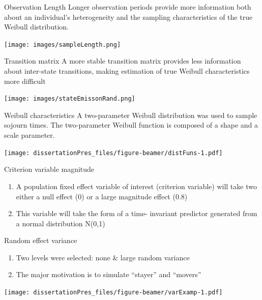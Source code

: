 \documentclass[
  ignorenonframetext,
]{beamer}
\providecommand{\tightlist}{%
  \setlength{\itemsep}{0pt}\setlength{\parskip}{0pt}}
\begin{document}
\begin{frame}{Observation Length}
\label{observation-length}
Longer observation periods provide more information both about an
individual's heterogeneity and the sampling characteristics of the true
Weibull distribution.

\begin{block}{}
\label{section-1}
\texttt{[image: images/sampleLength.png]}
\end{block}
\end{frame}

\begin{frame}{Transition matrix}
\label{transition-matrix}
A more stable transition matrix provides less information about
inter-state transitions, making estimation of true Weibull
characteristics more difficult

\begin{block}{}
\label{section-2}
\texttt{[image: images/stateEmissonRand.png]}
\end{block}
\end{frame}

\begin{frame}{Weibull characteristics}
\label{weibull-characteristics}
A two-parameter Weibull distribution was used to sample sojourn times.
The two-parameter Weibull function is composed of a shape and a scale
parameter.

\texttt{[image: dissertationPres\_files/figure-beamer/distFuns-1.pdf]}
\end{frame}

\begin{frame}{Criterion variable magnitude}
\label{criterion-variable-magnitude}
\begin{enumerate}
\tightlist
\item
  A population fixed effect variable of interest (criterion variable)
  will take two either a null effect (0) or a large magnitude effect
  (0.8)
\item
  This variable will take the form of a time- invariant predictor
  generated from a normal distribution N(0,1)
\end{enumerate}
\end{frame}

\begin{frame}{Random effect variance}
\label{random-effect-variance}
\begin{enumerate}
\tightlist
\item
  Two levels were selected: none \& large random variance
\item
  The major motivation is to simulate ``stayer'' and ``movers''
\end{enumerate}

\texttt{[image: dissertationPres\_files/figure-beamer/varExamp-1.pdf]}
\end{frame}
\end{document}
